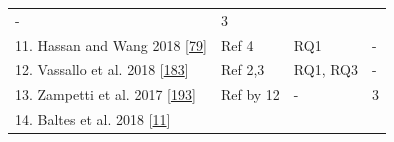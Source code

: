 \documentclass[]{book}
\begin{document}
\begin{longtable}[]{@{}llll@{}}
\begin{minipage}[t]{0.14\columnwidth}
-\strut
\end{minipage} & \begin{minipage}[t]{0.06\columnwidth}\raggedright\strut
3\strut
\end{minipage}\tabularnewline
\begin{minipage}[t]{0.48\columnwidth}\raggedright\strut
11. Hassan and Wang 2018
{[}\protect\hyperlink{ref-hassan2018hirebuild}{79}{]}\strut
\end{minipage} & \begin{minipage}[t]{0.20\columnwidth}\raggedright\strut
Ref 4\strut
\end{minipage} & \begin{minipage}[t]{0.14\columnwidth}\raggedright\strut
RQ1\strut
\end{minipage} & \begin{minipage}[t]{0.06\columnwidth}\raggedright\strut
-\strut
\end{minipage}\tabularnewline
\begin{minipage}[t]{0.48\columnwidth}\raggedright\strut
12. Vassallo et al. 2018
{[}\protect\hyperlink{ref-vassallo2018break}{183}{]}\strut
\end{minipage} & \begin{minipage}[t]{0.20\columnwidth}\raggedright\strut
Ref 2,3\strut
\end{minipage} & \begin{minipage}[t]{0.14\columnwidth}\raggedright\strut
RQ1, RQ3\strut
\end{minipage} & \begin{minipage}[t]{0.06\columnwidth}\raggedright\strut
-\strut
\end{minipage}\tabularnewline
\begin{minipage}[t]{0.48\columnwidth}\raggedright\strut
13. Zampetti et al. 2017
{[}\protect\hyperlink{ref-zampetti2017open}{193}{]}\strut
\end{minipage} & \begin{minipage}[t]{0.20\columnwidth}\raggedright\strut
Ref by 12\strut
\end{minipage} & \begin{minipage}[t]{0.14\columnwidth}\raggedright\strut
-\strut
\end{minipage} & \begin{minipage}[t]{0.06\columnwidth}\raggedright\strut
3\strut
\end{minipage}\tabularnewline
\begin{minipage}[t]{0.48\columnwidth}\raggedright\strut
14. Baltes et al. 2018
{[}\protect\hyperlink{ref-baltes2018no}{11}{]}\strut

\end{minipage}
\end{longtable}
\end{document}
